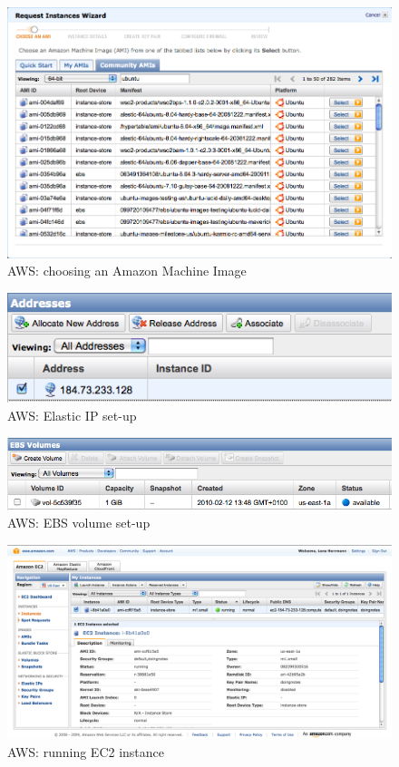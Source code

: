 \begin{figure}[H] 
  \begin{center}
    \includegraphics[width=\textwidth]{grafik/aws-select-AMI} 
  \end{center}
  \caption{AWS: choosing an Amazon Machine Image}
  \label{fig:aws-ami}
\end{figure}

\begin{figure}[H] 
  \begin{center}
    \includegraphics[width=\textwidth]{grafik/aws-ip} 
  \end{center}
  \caption{AWS: Elastic IP set-up}
  \label{fig:aws-ip}
\end{figure}

\begin{figure}[H] 
  \begin{center}
    \includegraphics[width=\textwidth]{grafik/aws-ebs-volume} 
  \end{center}
  \caption{AWS: EBS volume set-up}
  \label{fig:aws-ebs}
\end{figure}


\begin{figure}[H] 
  \begin{center}
    \includegraphics[width=\textwidth]{grafik/aws-ec2-management-console} 
  \end{center}
  \caption{AWS: running EC2 instance}
  \label{fig:aws-console}
\end{figure}